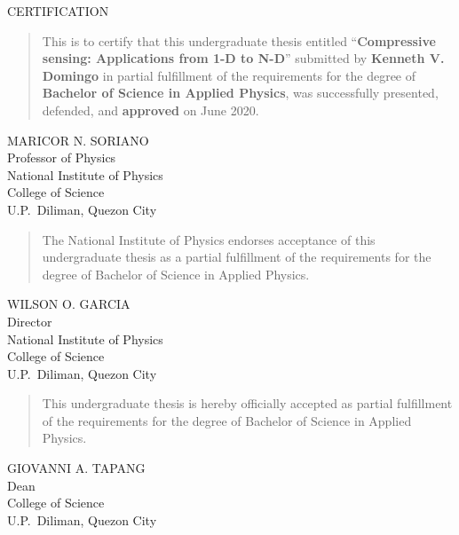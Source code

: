 \begin{center}
	\uppercase{\small Certification}
\end{center}

\begin{quotation}
	This is to certify that this undergraduate thesis entitled ``\textbf{Compressive sensing: Applications from 1-D to N-D}'' submitted by \textbf{Kenneth V. Domingo} in partial fulfillment of the requirements for the degree of \textbf{Bachelor of Science in Applied Physics}, was successfully presented, defended, and \textbf{approved} on June 2020.
\end{quotation}

\vspace{0.25in}

\begin{flushright}
	\parbox{0.4\textwidth}{
		\small\baselineskip=0.17in\uppercase\expandafter{Maricor N. Soriano}\\
		Professor of Physics \\
		National Institute of Physics \\
		College of Science \\
		U.P.~Diliman, Quezon City
	}
\end{flushright}

\vspace{0.25in}

\begin{quotation}
	The National Institute of Physics endorses acceptance of this undergraduate thesis as a partial fulfillment of the requirements for the degree of Bachelor of Science in Applied Physics.
\end{quotation}

\vspace{0.25in}

\begin{flushright}
	\parbox{0.4\textwidth}{
		\small\baselineskip=0.17in\uppercase\expandafter{Wilson O. Garcia}\\
		Director \\
		National Institute of Physics \\
		College of Science \\
		U.P.~Diliman, Quezon City
	}
\end{flushright}

\vspace{0.25in}

\begin{quotation}
	This undergraduate thesis is hereby officially accepted as partial fulfillment of the requirements for the degree of Bachelor of Science in Applied Physics.
\end{quotation}

\vspace{0.25in}

\begin{flushright}
	\parbox{0.4\textwidth}{
		\small\baselineskip=0.17in\uppercase\expandafter{Giovanni A. Tapang}\\
		Dean \\
		College of Science \\
		U.P.~Diliman, Quezon City
	}
\end{flushright}
